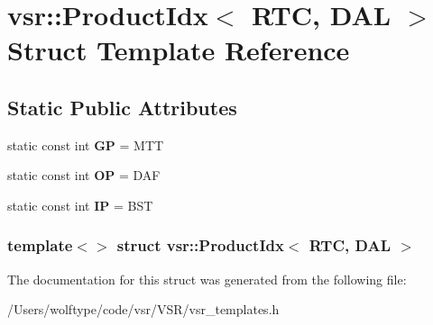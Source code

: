\hypertarget{structvsr_1_1_product_idx_3_01_r_t_c_00_01_d_a_l_01_4}{\section{vsr\-:\-:Product\-Idx$<$ R\-T\-C, D\-A\-L $>$ Struct Template Reference}
\label{structvsr_1_1_product_idx_3_01_r_t_c_00_01_d_a_l_01_4}
}
\subsection*{Static Public Attributes}
\begin{DoxyCompactItemize}
\item 
\hypertarget{structvsr_1_1_product_idx_3_01_r_t_c_00_01_d_a_l_01_4_a3bdd0b9bf94ebc840112b05c4cf96f59}{static const int {\bfseries G\-P} = M\-T\-T}\label{structvsr_1_1_product_idx_3_01_r_t_c_00_01_d_a_l_01_4_a3bdd0b9bf94ebc840112b05c4cf96f59}

\item 
\hypertarget{structvsr_1_1_product_idx_3_01_r_t_c_00_01_d_a_l_01_4_ab541beda47dc2aa8fcf255ed1086bbac}{static const int {\bfseries O\-P} = D\-A\-F}\label{structvsr_1_1_product_idx_3_01_r_t_c_00_01_d_a_l_01_4_ab541beda47dc2aa8fcf255ed1086bbac}

\item 
\hypertarget{structvsr_1_1_product_idx_3_01_r_t_c_00_01_d_a_l_01_4_a8cedcce3f73ae99001fe9b17f5ac8369}{static const int {\bfseries I\-P} = B\-S\-T}\label{structvsr_1_1_product_idx_3_01_r_t_c_00_01_d_a_l_01_4_a8cedcce3f73ae99001fe9b17f5ac8369}

\end{DoxyCompactItemize}
\subsubsection*{template$<$$>$ struct vsr\-::\-Product\-Idx$<$ R\-T\-C, D\-A\-L $>$}



The documentation for this struct was generated from the following file\-:\begin{DoxyCompactItemize}
\item 
/\-Users/wolftype/code/vsr/\-V\-S\-R/vsr\-\_\-templates.\-h\end{DoxyCompactItemize}
